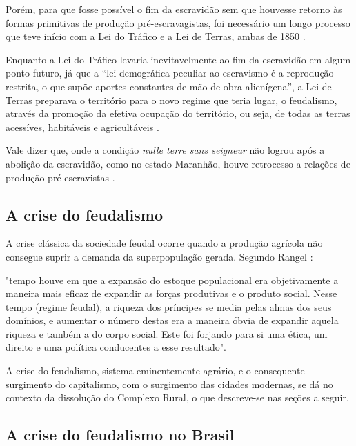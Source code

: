 \documentclass[
	12pt,				%
	oneside,			%
	a4paper,			%
	chapter=TITLE,		%
	section=TITLE,		%
	english,			%
	brazil				%
	]{abntex2}
\begin{document}
Porém, para que fosse possível o fim da escravidão sem que houvesse retorno às
formas primitivas de produção pré-escravagistas, foi necessário um longo
processo que teve início com a Lei do Tráfico e a Lei de Terras, ambas de 1850
\autocite[732]{rangel1989}.

Enquanto a Lei do Tráfico levaria inevitavelmente ao fim da escravidão em algum
ponto futuro, já que a ``lei demográfica peculiar ao escravismo é a reprodução
restrita, o que supõe aportes constantes de mão de obra alienígena'', a Lei de
Terras preparava o território para o novo regime que teria lugar, o feudalismo,
através da promoção da efetiva ocupação do território, ou seja, de todas as
terras acessíves, habitáveis e agricultáveis \autocite[732-733]{rangel1989}.

Vale dizer que, onde a condição \emph{nulle terre sans seigneur} não logrou após a
abolição da escravidão, como no estado Maranhão, houve retrocesso a relações de
produção pré-escravistas \autocite[733-734]{rangel1989}.

\hypertarget{a-crise-do-feudalismo}{%
\subsection{A crise do feudalismo}\label{a-crise-do-feudalismo}}

A crise clássica da sociedade feudal ocorre quando a produção agrícola não
consegue suprir a demanda da superpopulação gerada. Segundo Rangel
\autocite*[219]{rangel1961}:
\begin{citacao} 
"tempo houve em que a expansão do estoque populacional era objetivamente a
maneira mais eficaz de expandir as forças produtivas e o produto social. Nesse
tempo (regime feudal), a riqueza dos príncipes se media pelas almas dos seus
domínios, e aumentar o número destas era a maneira óbvia de expandir aquela
riqueza e também a do corpo social. Este foi forjando para si uma ética, um
direito e uma política conducentes a esse resultado".
\end{citacao}
A crise do feudalismo, sistema eminentemente agrário, e o consequente surgimento
do capitalismo, com o surgimento das cidades modernas, se dá no contexto da
dissolução do Complexo Rural, o que descreve-se nas seções a seguir.

\hypertarget{a-crise-do-feudalismo-no-brasil}{%
\subsection{A crise do feudalismo no Brasil}\label{a-crise-do-feudalismo-no-brasil}}
\end{document}

